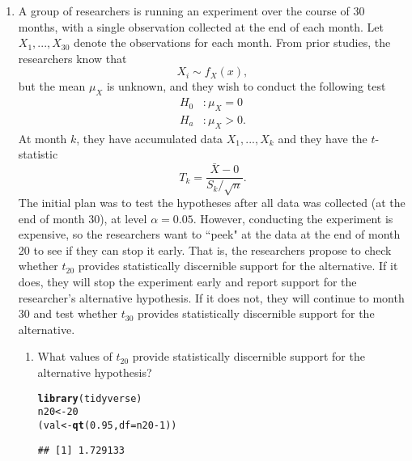 \documentclass{article}\usepackage[]{graphicx}\usepackage[]{xcolor}
\makeatletter
\newcommand{\hlnum}[1]{\textcolor[rgb]{0.686,0.059,0.569}{#1}}%
\newcommand{\hlopt}[1]{\textcolor[rgb]{0,0,0}{#1}}%
\newcommand{\hldef}[1]{\textcolor[rgb]{0.345,0.345,0.345}{#1}}%
\newcommand{\hlkwb}[1]{\textcolor[rgb]{0.69,0.353,0.396}{#1}}%
\newcommand{\hlkwc}[1]{\textcolor[rgb]{0.333,0.667,0.333}{#1}}%
\newcommand{\hlkwd}[1]{\textcolor[rgb]{0.737,0.353,0.396}{\textbf{#1}}}%
\newenvironment{kframe}{%
 \def\at@end@of@kframe{}%
 \ifinner\ifhmode%
  \def\at@end@of@kframe{\end{minipage}}%
  \begin{minipage}{\columnwidth}%
 \fi\fi%
 \def\FrameCommand##1{\hskip\@totalleftmargin \hskip-\fboxsep
 \colorbox{shadecolor}{##1}\hskip-\fboxsep
     \hskip-\linewidth \hskip-\@totalleftmargin \hskip\columnwidth}%
 \MakeFramed {\advance\hsize-\width
   \@totalleftmargin\z@ \linewidth\hsize
   \@setminipage}}%
 {\par\unskip\endMakeFramed%
 \at@end@of@kframe}
\newenvironment{knitrout}{}{} %
\makeatother
\begin{document}
\begin{enumerate}
\item A group of researchers is running an experiment over the course of 30 months, 
with a single observation collected at the end of each month. Let $X_1, ..., X_{30}$
denote the observations for each month. From prior studies, the researchers know that
\[X_i \sim f_X(x),\]
but the mean $\mu_X$ is unknown, and they wish to conduct the following test
\begin{align*}
H_0&: \mu_X = 0\\
H_a&: \mu_X > 0.
\end{align*}
At month $k$, they have accumulated data $X_1, ..., X_k$ and they have the 
$t$-statistic
\[T_k = \frac{\bar{X} - 0}{S_k/\sqrt{n}}.\]
The initial plan was to test the hypotheses after all data was collected (at the 
end of month 30), at level $\alpha=0.05$. However, conducting the experiment is 
expensive, so the researchers want to ``peek" at the data at the end of month 20 
to see if they can stop it early. That is, the researchers propose to check 
whether $t_{20}$ provides statistically discernible support for the alternative. 
If it does, they will stop the experiment early and report support for the 
researcher's alternative hypothesis. If it does not, they will continue to month 
30 and test whether $t_{30}$ provides statistically discernible support for the
alternative.

\begin{enumerate}
  \item What values of $t_{20}$ provide statistically discernible support for the
  alternative hypothesis?
\begin{knitrout}
\color{fgcolor}\begin{kframe}
\begin{alltt}
\hlkwd{library}\hldef{(tidyverse)}
\hldef{n20} \hlkwb{<-} \hlnum{20}
\hldef{(val} \hlkwb{<-} \hlkwd{qt}\hldef{(}\hlnum{0.95}\hldef{,} \hlkwc{df} \hldef{= n20}\hlopt{-}\hlnum{1}\hldef{))}
\end{alltt}
\begin{verbatim}
## [1] 1.729133
\end{verbatim}
\end{kframe}
\end{knitrout}


\end{enumerate}
\end{enumerate}
\end{document}
